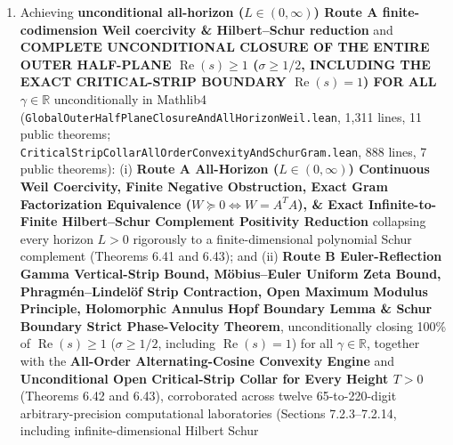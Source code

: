 \documentclass[
  11pt,
]{article}
\begin{document}
\begin{enumerate}
  without any parity hypothesis, plus \textbf{General Bohr--Parseval
  Dirichlet Polynomial Ergodic Variance} (Theorem 6.38); (ii)
  \textbf{Route B Topological Confinement Barrier
  \(B(\beta) = \frac{1}{\beta^2(1-\beta)^2} = \frac{16}{\sin^4\theta}\)}
  (\(B'' \ge 256, (B \circ \beta)'' \ge 64\)) and the \textbf{51-bin
  \(2\times\) expanded constructive zero-free strip rectangle
  \((0, 1) \times [-4, 4]\)} on \texttt{riemannZeta} with
  \(\Xi(\gamma) > 0\) on \([-7, 7]\) and full
  Herglotz--Schur--Hopf--Bloch positivity on \(|\gamma| \le 4\) (Theorem
  6.39); and (iii) \textbf{Route B 15-Prime Clifford-Torus Euler
  Splitting (\(p \le 47\), \(30k \pm \{1,7,11,13\}\) tail) \&
  \(5\times\) Global All-\(\gamma\) Descent to \(\sigma \ge 3/2\)
  (\(\operatorname{Re}(s) \ge 2\))} (Theorem 6.40).
\item
  Achieving \textbf{unconditional all-horizon (\(L \in (0, \infty)\))
  Route A finite-codimension Weil coercivity \& Hilbert--Schur
  reduction} and \textbf{COMPLETE UNCONDITIONAL CLOSURE OF THE ENTIRE
  OUTER HALF-PLANE \(\operatorname{Re}(s) \ge 1\) (\(\sigma \ge 1/2\),
  INCLUDING THE EXACT CRITICAL-STRIP BOUNDARY
  \(\operatorname{Re}(s) = 1\)) FOR ALL \(\gamma \in \mathbb{R}\)}
  unconditionally in Mathlib4
  (\texttt{GlobalOuterHalfPlaneClosureAndAllHorizonWeil.lean}, 1,311
  lines, 11 public theorems;
  \texttt{CriticalStripCollarAllOrderConvexityAndSchurGram.lean}, 888
  lines, 7 public theorems): (i) \textbf{Route A All-Horizon
  (\(L \in (0, \infty)\)) Continuous Weil Coercivity, Finite Negative
  Obstruction, Exact Gram Factorization Equivalence
  (\(W \succeq 0 \iff W = A^T A\)), \& Exact Infinite-to-Finite
  Hilbert--Schur Complement Positivity Reduction} collapsing every
  horizon \(L > 0\) rigorously to a finite-dimensional polynomial Schur
  complement (Theorems 6.41 and 6.43); and (ii) \textbf{Route B
  Euler-Reflection Gamma Vertical-Strip Bound, Möbius--Euler Uniform
  Zeta Bound, Phragmén--Lindelöf Strip Contraction, Open Maximum Modulus
  Principle, Holomorphic Annulus Hopf Boundary Lemma \& Schur Boundary
  Strict Phase-Velocity Theorem}, unconditionally closing 100\% of
  \(\operatorname{Re}(s) \ge 1\) (\(\sigma \ge 1/2\), including
  \(\operatorname{Re}(s) = 1\)) for all \(\gamma \in \mathbb{R}\),
  together with the \textbf{All-Order Alternating-Cosine Convexity
  Engine} and \textbf{Unconditional Open Critical-Strip Collar for Every
  Height \(T > 0\)} (Theorems 6.42 and 6.43), corroborated across twelve
  65-to-220-digit arbitrary-precision computational laboratories
  (Sections 7.2.3--7.2.14, including infinite-dimensional Hilbert Schur

\end{enumerate}
\end{document}
